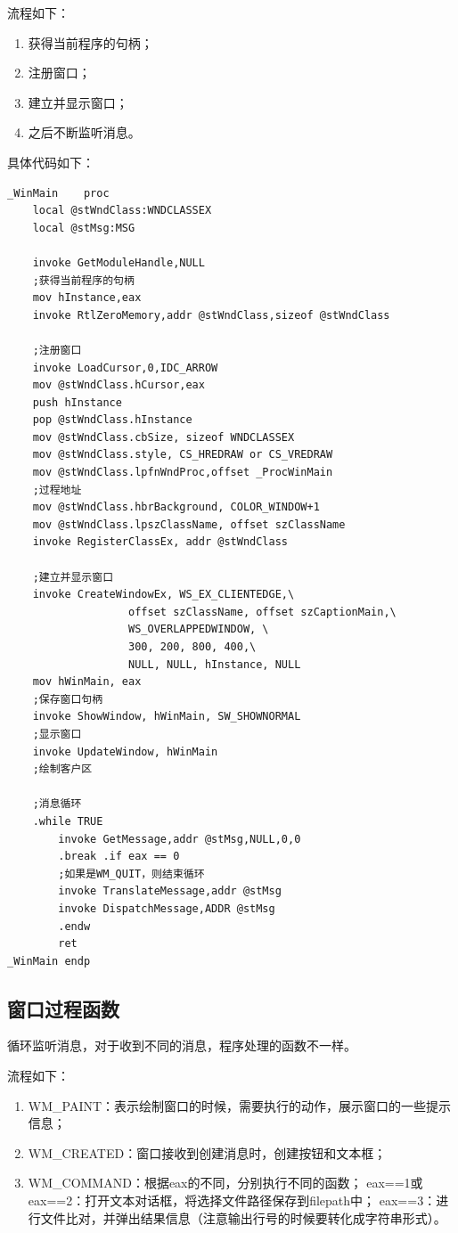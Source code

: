 流程如下：
\begin{enumerate}
    \item 获得当前程序的句柄；
    \item 注册窗口；
    \item 建立并显示窗口；
    \item 之后不断监听消息。
\end{enumerate}

具体代码如下：
\begin{lstlisting}
_WinMain	proc	
    local @stWndClass:WNDCLASSEX
    local @stMsg:MSG

    invoke GetModuleHandle,NULL		
    ;获得当前程序的句柄
    mov hInstance,eax
    invoke RtlZeroMemory,addr @stWndClass,sizeof @stWndClass

    ;注册窗口
    invoke LoadCursor,0,IDC_ARROW
    mov @stWndClass.hCursor,eax
    push hInstance
    pop @stWndClass.hInstance
    mov @stWndClass.cbSize, sizeof WNDCLASSEX			
    mov @stWndClass.style, CS_HREDRAW or CS_VREDRAW
    mov @stWndClass.lpfnWndProc,offset _ProcWinMain	
    ;过程地址		
    mov @stWndClass.hbrBackground, COLOR_WINDOW+1			
    mov @stWndClass.lpszClassName, offset szClassName		
    invoke RegisterClassEx, addr @stWndClass

    ;建立并显示窗口
    invoke CreateWindowEx, WS_EX_CLIENTEDGE,\  
                   offset szClassName, offset szCaptionMain,\  
                   WS_OVERLAPPEDWINDOW, \
                   300, 200, 800, 400,\	
                   NULL, NULL, hInstance, NULL
    mov hWinMain, eax										
    ;保存窗口句柄
    invoke ShowWindow, hWinMain, SW_SHOWNORMAL				 
    ;显示窗口		
    invoke UpdateWindow, hWinMain							
    ;绘制客户区
    
    ;消息循环
    .while TRUE
        invoke GetMessage,addr @stMsg,NULL,0,0
        .break .if eax == 0		
        ;如果是WM_QUIT，则结束循环
        invoke TranslateMessage,addr @stMsg
        invoke DispatchMessage,ADDR @stMsg
        .endw
        ret
_WinMain endp
\end{lstlisting}

\subsection{窗口过程函数}
循环监听消息，对于收到不同的消息，程序处理的函数不一样。

流程如下：
\begin{enumerate}
\item WM\_PAINT：表示绘制窗口的时候，需要执行的动作，展示窗口的一些提示信息；
\item WM\_CREATED：窗口接收到创建消息时，创建按钮和文本框；
\item WM\_COMMAND：根据eax的不同，分别执行不同的函数；
    \iitem eax==1或eax==2：打开文本对话框，将选择文件路径保存到filepath中；
    \iitem eax==3：进行文件比对，并弹出结果信息（注意输出行号的时候要转化成字符串形式）。
\end{enumerate}

